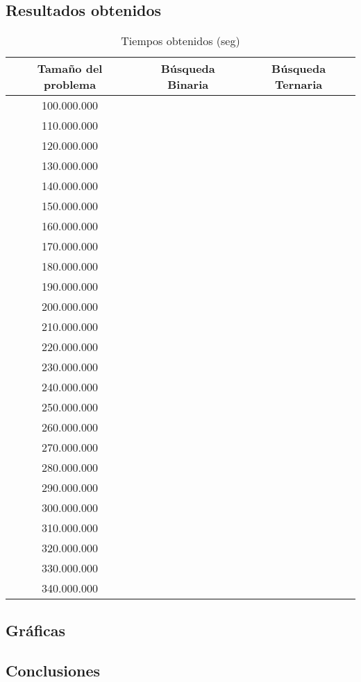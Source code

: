 \documentclass[12pt,spanish]{article}
\begin{document}
\subsection{Resultados obtenidos}
\begin{table}[H]
\centering
\begin{tabular}{|c|c|c|}
\hline
\textbf{Tamaño del problema} & \textbf{Búsqueda Binaria} & \textbf{Búsqueda Ternaria}\\
\hline
100.000.000 & \\
\hline
110.000.000 &\\
\hline
120.000.000 & \\
\hline
130.000.000 & \\
\hline
140.000.000 & \\
\hline
150.000.000 & \\
\hline
160.000.000 & \\
\hline
170.000.000 & \\
\hline
180.000.000 & \\
\hline
190.000.000 & \\
\hline
200.000.000 & \\
\hline
210.000.000 & \\
\hline
220.000.000 & \\
\hline
230.000.000 & \\
\hline
240.000.000 & \\
\hline
250.000.000 & \\
\hline
260.000.000 & \\
\hline
270.000.000 & \\
\hline
280.000.000 & \\
\hline
290.000.000 & \\
\hline
300.000.000 & \\
\hline
310.000.000 & \\
\hline
320.000.000 & \\
\hline
330.000.000 & \\
\hline
340.000.000 & \\
\hline
\end{tabular}
\caption{Tiempos obtenidos (seg)}
\end{table}

\subsection{Gráficas}

\subsection{Conclusiones}
\end{document}
